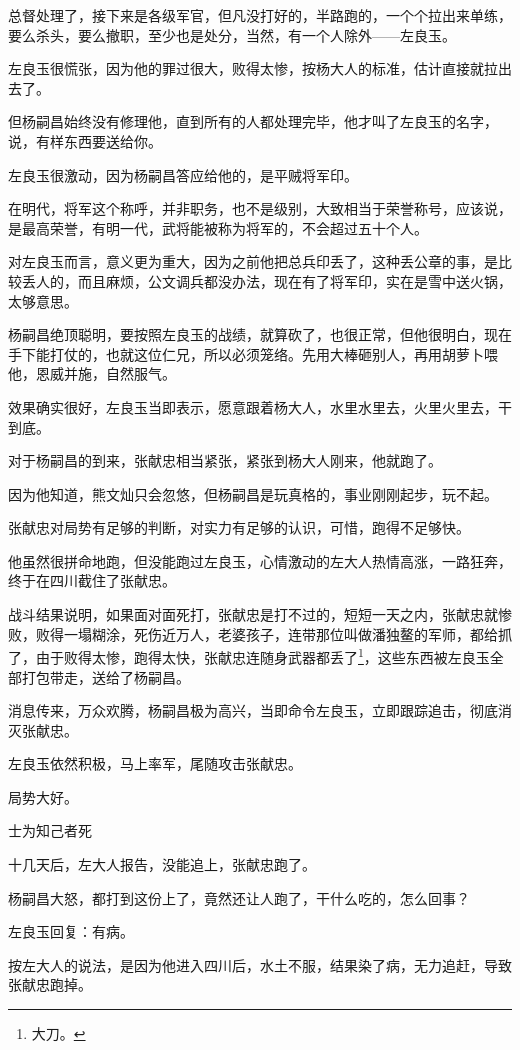 \begin{multicols}{\theparacolNo}
		总督处理了，接下来是各级军官，但凡没打好的，半路跑的，一个个拉出来单练，要么杀头，要么撤职，至少也是处分，当然，有一个人除外——左良玉。

		左良玉很慌张，因为他的罪过很大，败得太惨，按杨大人的标准，估计直接就拉出去了。

		但杨嗣昌始终没有修理他，直到所有的人都处理完毕，他才叫了左良玉的名字，说，有样东西要送给你。

		左良玉很激动，因为杨嗣昌答应给他的，是平贼将军印。

		在明代，将军这个称呼，并非职务，也不是级别，大致相当于荣誉称号，应该说，是最高荣誉，有明一代，武将能被称为将军的，不会超过五十个人。

		对左良玉而言，意义更为重大，因为之前他把总兵印丢了，这种丢公章的事，是比较丢人的，而且麻烦，公文调兵都没办法，现在有了将军印，实在是雪中送火锅，太够意思。

		杨嗣昌绝顶聪明，要按照左良玉的战绩，就算砍了，也很正常，但他很明白，现在手下能打仗的，也就这位仁兄，所以必须笼络。先用大棒砸别人，再用胡萝卜喂他，恩威并施，自然服气。

		效果确实很好，左良玉当即表示，愿意跟着杨大人，水里水里去，火里火里去，干到底。

		对于杨嗣昌的到来，张献忠相当紧张，紧张到杨大人刚来，他就跑了。

		因为他知道，熊文灿只会忽悠，但杨嗣昌是玩真格的，事业刚刚起步，玩不起。

		张献忠对局势有足够的判断，对实力有足够的认识，可惜，跑得不足够快。

		他虽然很拼命地跑，但没能跑过左良玉，心情激动的左大人热情高涨，一路狂奔，终于在四川截住了张献忠。

		战斗结果说明，如果面对面死打，张献忠是打不过的，短短一天之内，张献忠就惨败，败得一塌糊涂，死伤近万人，老婆孩子，连带那位叫做潘独鳌的军师，都给抓了，由于败得太惨，跑得太快，张献忠连随身武器都丢了\footnote{大刀。}，这些东西被左良玉全部打包带走，送给了杨嗣昌。

		消息传来，万众欢腾，杨嗣昌极为高兴，当即命令左良玉，立即跟踪追击，彻底消灭张献忠。

		左良玉依然积极，马上率军，尾随攻击张献忠。

		局势大好。

		士为知己者死

		十几天后，左大人报告，没能追上，张献忠跑了。

		杨嗣昌大怒，都打到这份上了，竟然还让人跑了，干什么吃的，怎么回事？

		左良玉回复：有病。

		按左大人的说法，是因为他进入四川后，水土不服，结果染了病，无力追赶，导致张献忠跑掉。


\end{multicols}
